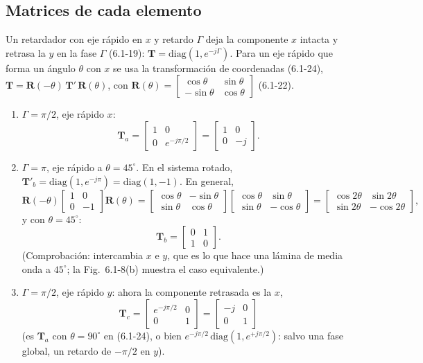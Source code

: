 \documentclass{article}
\newcommand{\Tm}{\mathbf{T}}
\newcommand{\Rm}{\mathbf{R}}
\begin{document}
\subsection*{Matrices de cada elemento}

Un retardador con eje rápido en $x$ y retardo $\Gamma$ deja la componente $x$ intacta y
retrasa la $y$ en la fase $\Gamma$ (6.1-19): $\Tm=\mathrm{diag}(1,e^{-j\Gamma})$. Para un eje
rápido que forma un ángulo $\theta$ con $x$ se usa la transformación de coordenadas (6.1-24),
$\Tm=\Rm(-\theta)\,\Tm'\,\Rm(\theta)$, con
$\Rm(\theta)=\begin{bmatrix}\cos\theta&\sin\theta\\-\sin\theta&\cos\theta\end{bmatrix}$ (6.1-22).

\begin{enumerate}
\item[(a)] $\Gamma=\pi/2$, eje rápido $x$:
\[
\Tm_a=\begin{bmatrix}1&0\\0&e^{-j\pi/2}\end{bmatrix}=\begin{bmatrix}1&0\\0&-j\end{bmatrix}.
\]
\item[(b)] $\Gamma=\pi$, eje rápido a $\theta=45^\circ$. En el sistema rotado,
$\Tm'_b=\mathrm{diag}(1,e^{-j\pi})=\mathrm{diag}(1,-1)$. En general,
\[
\Rm(-\theta)\begin{bmatrix}1&0\\0&-1\end{bmatrix}\Rm(\theta)
=\begin{bmatrix}\cos\theta&-\sin\theta\\ \sin\theta&\cos\theta\end{bmatrix}
\begin{bmatrix}\cos\theta&\sin\theta\\ \sin\theta&-\cos\theta\end{bmatrix}
=\begin{bmatrix}\cos2\theta&\sin2\theta\\ \sin2\theta&-\cos2\theta\end{bmatrix},
\]
y con $\theta=45^\circ$:
\[
\Tm_b=\begin{bmatrix}0&1\\1&0\end{bmatrix}.
\]
(Comprobación: intercambia $x$ e $y$, que es lo que hace una lámina de media onda a $45^\circ$;
la Fig.~6.1-8(b) muestra el caso equivalente.)
\item[(c)] $\Gamma=\pi/2$, eje rápido $y$: ahora la componente retrasada es la $x$,
\[
\Tm_c=\begin{bmatrix}e^{-j\pi/2}&0\\0&1\end{bmatrix}=\begin{bmatrix}-j&0\\0&1\end{bmatrix}
\]
(es $\Tm_a$ con $\theta=90^\circ$ en (6.1-24), o bien $e^{-j\pi/2}\,\mathrm{diag}(1,e^{+j\pi/2})$:
salvo una fase global, un retardo de $-\pi/2$ en $y$).
\end{enumerate}
\end{document}
